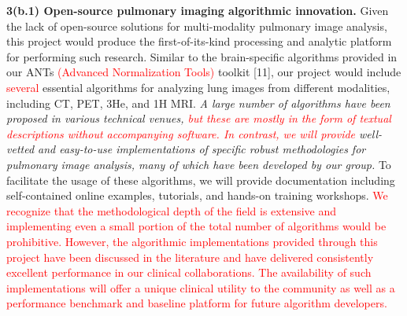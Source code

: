\documentclass[11pt,]{article}
\begin{document}
\textbf{3(b.1) Open-source pulmonary imaging algorithmic innovation.}
Given the lack of open-source solutions for multi-modality pulmonary
image analysis, this project would produce the first-of-its-kind
processing and analytic platform for performing such research. Similar
to the brain-specific algorithms provided in our ANTs
\textcolor{red}{(Advanced Normalization Tools)} toolkit {[}11{]}, our
project would include \textcolor{red}{several} essential algorithms for
analyzing lung images from different modalities, including CT, PET, 3He,
and 1H MRI. \emph{A large number of algorithms have been proposed in
various technical venues,
\textcolor{red}{but these are mostly in the form of
textual descriptions without accompanying software.}
\textcolor{red}{In contrast, we will provide} well-vetted and
easy-to-use implementations of specific robust methodologies for
pulmonary image analysis, many of which have been developed by our
group.} To facilitate the usage of these algorithms, we will provide
documentation including self-contained online examples, tutorials, and
hands-on training workshops.
\textcolor{red}{We recognize that the methodological depth of the field is extensive
and implementing even a small portion of the total number of algorithms would be
prohibitive.}
\textcolor{red}{However, the algorithmic implementations provided through this
project have been discussed in the literature and have delivered consistently
excellent performance in our
clinical collaborations.  The availability of such implementations will offer a
unique clinical utility to the community as well as a performance benchmark
and baseline platform for future
algorithm developers.}
\end{document}
